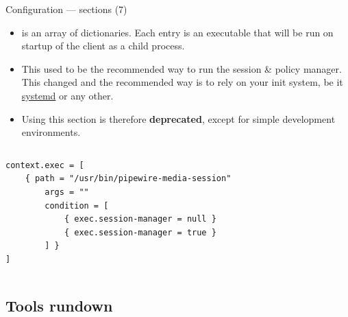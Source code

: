 \begin{frame}[fragile]{Configuration — sections (7)}

  \begin{itemize}

  \item {} is an array of dictionaries. Each entry
    is an executable that will be run on startup of the client as a
    child process.

  \item This used to be the recommended way to run the session \&
    policy manager. This changed and the recommended way is to rely on
    your init system, be it \href{https://systemd.io/}{systemd} or any
    other.

  \item Using this section is therefore \textbf{deprecated}, except for
    simple development environments.

  \end{itemize}

  \begin{columns}
    \begin{block}{}
      \fontsize{9}{9}\selectfont
        \begin{verbatim}
context.exec = [
    { path = "/usr/bin/pipewire-media-session"
        args = ""
        condition = [
            { exec.session-manager = null }
            { exec.session-manager = true }
        ] }
]
        \end{verbatim}
      \end{block}
  \end{columns}

\end{frame}



\subsection{Tools rundown}



